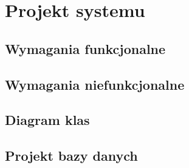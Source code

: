 \section{Projekt systemu}
\subsection{Wymagania funkcjonalne}
\subsection{Wymagania niefunkcjonalne}
\subsection{Diagram klas}
\subsection{Projekt bazy danych}